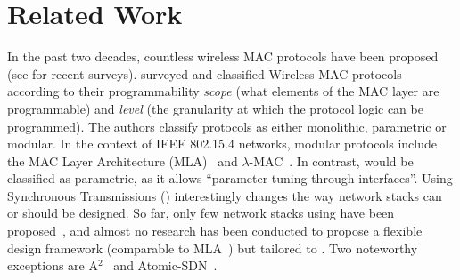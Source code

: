 
\section{Related Work}
\label{sec:relwork}


In the past two decades, countless wireless MAC protocols have been proposed (see \eg \cite{teleshermeto2017Scheduling,bartolomeu2016Survey} for recent surveys).
%
\cite{isolani2018Survey} surveyed and classified Wireless MAC protocols according to their programmability \emph{scope} (what elements of the MAC layer are programmable) and \emph{level} (the granularity at which the protocol logic can be programmed). The authors classify protocols as either monolithic, parametric or modular.
In the context of IEEE 802.15.4 networks, modular protocols include \eg the MAC Layer Architecture (MLA)~\cite{klues2007MLA} and $\lambda$-MAC~\cite{parker2010lambda}. In contrast, \baloo would be classified as parametric, as it allows ``parameter tuning through interfaces''.
Using Synchronous Transmissions (\ST) interestingly changes the way network stacks can or should be designed.
So far, only few network stacks using \ST have been proposed~\cite{ferrari2012LWB,istomin2018Interferenceresilient,sarkar2016Sleeping,sutton2017eLWB,jacob2017TTW_extended,suzuki2013Choco}, and almost no research has been conducted to propose a flexible design framework (\eg comparable to MLA~\cite{klues2007MLA}) but tailored to \ST.
Two noteworthy exceptions are A$^2$~\cite{alnahas2017a2} and Atomic-SDN~\cite{baddeley2019AtomicSDN}.

